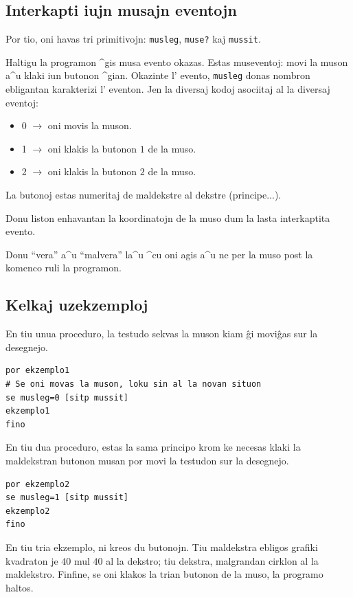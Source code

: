 \subsection{Interkapti iujn musajn eventojn}

Por tio, oni havas tri primitivojn: \texttt{musleg}, \texttt{muse?}
kaj \texttt{mussit}.


Haltigu la programon ^gis musa evento okazas.  Estas museventoj: movi
la muson a^u klaki iun butonon ^gian.  Okazinte l' evento,
\texttt{musleg} donas nombron ebligantan karakterizi l' eventon.  Jen
la diversaj kodoj asociitaj al la diversaj eventoj:
\begin{itemize}
 \item 0 $\to$ oni movis la muson.
 \item 1 $\to$ oni klakis la butonon $1$ de la muso.
 \item 2 $\to$ oni klakis la butonon $2$ de la muso.
\end{itemize}
La butonoj estas numeritaj de maldekstre al dekstre (principe...).


Donu liston enhavantan la koordinatojn de la muso dum la lasta interkaptita evento.


Donu ``vera'' a^u ``malvera'' la^u ^cu oni agis a^u ne per la muso
post la komenco ruli la programon.

\subsection{Kelkaj uzekzemploj}

En tiu unua proceduro, la testudo sekvas la muson kiam ĝi moviĝas sur la desegnejo.
\begin{verbatim}
por ekzemplo1
# Se oni movas la muson, loku sin al la novan situon
se musleg=0 [sitp mussit]
ekzemplo1
fino
\end{verbatim}

En tiu dua proceduro, estas la sama principo krom ke necesas klaki la
maldekstran butonon musan por movi la testudon sur la desegnejo.
\begin{verbatim}
por ekzemplo2
se musleg=1 [sitp mussit]
ekzemplo2
fino
\end{verbatim}

En tiu tria ekzemplo, ni kreos du butonojn.  Tiu maldekstra ebligos
grafiki kvadraton je $40$ mul $40$ al la dekstro; tiu dekstra,
malgrandan cirklon al la maldekstro.  Finfine, se oni klakos la trian
butonon de la muso, la programo haltos.

